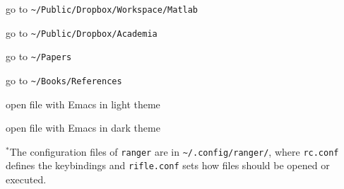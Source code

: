 \documentclass[fontsize=9pt, paper=letter, headings=normal, landscape]{scrartcl}
\newenvironment{commandlist}{\begin{description}[noitemsep]}{\end{description}}
\let\olditem\item
\renewcommand\item[1][]{\olditem[{#1}]\raggedright\dotfill}}%
\newenvironment{notes}{\vspace*{10mm}\small}{}
\begin{document}
\begin{multicols*}{3}
  \begin{commandlist}
  \item[gw] go to \texttt{\textasciitilde/Public/Dropbox/Workspace/Matlab}
  \item[ga] go to \texttt{\textasciitilde/Public/Dropbox/Academia}
  \item[gp] go to \texttt{\textasciitilde/Papers}
  \item[gr] go to \texttt{\textasciitilde/Books/References}
  \item[em] open file with Emacs in light theme
  \item[ec] open file with Emacs in dark theme
  \end{commandlist}

  \begin{notes}
    $^*$The configuration files of \texttt{ranger} are in
    \texttt{\textasciitilde/.config/ranger/}, where \texttt{rc.conf} defines
    the keybindings and \texttt{rifle.conf} sets how files should be opened
    or executed.
  \end{notes}

\end{multicols*}
\end{document}

